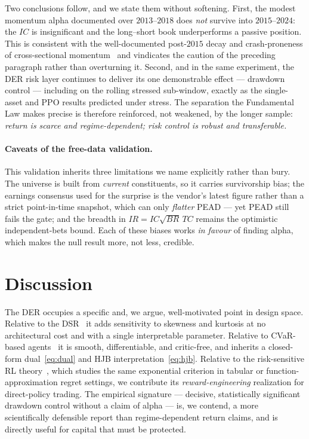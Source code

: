 \documentclass[11pt]{article}
\theoremstyle{definition}
\begin{document}
Two conclusions follow, and we state them without softening. First, the modest momentum
alpha documented over $2013$--$2018$ does \emph{not} survive into $2015$--$2024$: the
$IC$ is insignificant and the long--short book underperforms a passive position. This is
consistent with the well-documented post-$2015$ decay and crash-proneness of cross-sectional
momentum~\cite{daniel2016} and vindicates the caution of the preceding paragraph rather
than overturning it. Second, and in the same experiment, the DER risk layer continues to
deliver its one demonstrable effect --- drawdown control --- including on the rolling
stressed sub-window, exactly as the single-asset and PPO results predicted under stress.
The separation the Fundamental Law makes precise is therefore reinforced, not weakened, by
the longer sample: \emph{return is scarce and regime-dependent; risk control is robust and
transferable.}

\paragraph{Caveats of the free-data validation.} This validation inherits three
limitations we name explicitly rather than bury. The universe is built from
\emph{current} constituents, so it carries survivorship bias; the earnings consensus used
for the surprise is the vendor's latest figure rather than a strict point-in-time
snapshot, which can only \emph{flatter} PEAD --- yet PEAD still fails the gate; and the
breadth in $IR=IC\sqrt{BR}\,TC$ remains the optimistic independent-bets bound. Each of
these biases works \emph{in favour} of finding alpha, which makes the null result more,
not less, credible.

\section{Discussion}\label{sec:discussion}

The DER occupies a specific and, we argue, well-motivated point in design space.
Relative to the DSR~\cite{moody2001} it adds sensitivity to skewness and kurtosis at no
architectural cost and with a single interpretable parameter. Relative to
CVaR-based agents~\cite{rockafellar2000,benhenda2025} it is smooth, differentiable, and
critic-free, and inherits a closed-form dual~\eqref{eq:dual} and HJB
interpretation~\eqref{eq:hjb}. Relative to the risk-sensitive RL
theory~\cite{fei2020,fei2021,noorani2022}, which studies the same exponential criterion
in tabular or function-approximation regret settings, we contribute its
\emph{reward-engineering} realization for direct-policy trading. The empirical
signature --- decisive, statistically significant drawdown control without a claim of
alpha --- is, we contend, a more scientifically defensible report than regime-dependent
return claims, and is directly useful for capital that must be protected.
\end{document}
